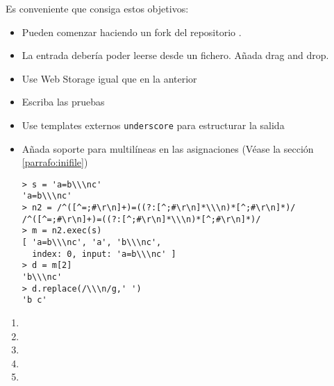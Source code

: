 Es conveniente que consiga estos objetivos:
\begin{itemize}
\item Pueden comenzar haciendo un fork del repositorio
.
\item La entrada debería poder leerse desde un fichero. Añada drag and drop.
\item Use Web Storage igual que en la anterior
\item Escriba las pruebas
\item Use templates externos \verb|underscore| para estructurar la salida
\item
Añada soporte para multilíneas en las asignaciones
(Véase la sección \ref{parrafo:inifile})
\begin{verbatim}
> s = 'a=b\\\nc'
'a=b\\\nc'
> n2 = /^([^=;#\r\n]+)=((?:[^;#\r\n]*\\\n)*[^;#\r\n]*)/
/^([^=;#\r\n]+)=((?:[^;#\r\n]*\\\n)*[^;#\r\n]*)/
> m = n2.exec(s)
[ 'a=b\\\nc', 'a', 'b\\\nc',
  index: 0, input: 'a=b\\\nc' ]
> d = m[2]
'b\\\nc'
> d.replace(/\\\n/g,' ')
'b c'
\end{verbatim}
\end{itemize}


\begin{enumerate}
\item 
{}
\item 
{}
\item 
{}
\item 
{}
\item 
{}
\end{enumerate}


